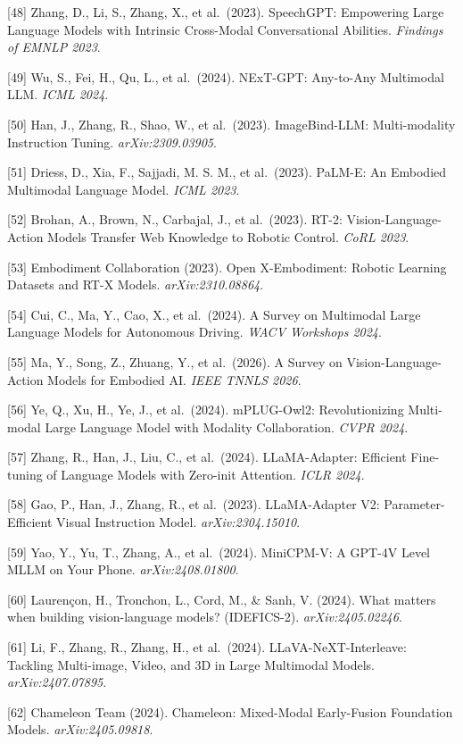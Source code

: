 {[}48{]} Zhang, D., Li, S., Zhang, X., et al.~(2023). SpeechGPT: Empowering Large Language Models with Intrinsic Cross-Modal Conversational Abilities. \emph{Findings of EMNLP 2023}.

{[}49{]} Wu, S., Fei, H., Qu, L., et al.~(2024). NExT-GPT: Any-to-Any Multimodal LLM. \emph{ICML 2024}.

{[}50{]} Han, J., Zhang, R., Shao, W., et al.~(2023). ImageBind-LLM: Multi-modality Instruction Tuning. \emph{arXiv:2309.03905}.

{[}51{]} Driess, D., Xia, F., Sajjadi, M. S. M., et al.~(2023). PaLM-E: An Embodied Multimodal Language Model. \emph{ICML 2023}.

{[}52{]} Brohan, A., Brown, N., Carbajal, J., et al.~(2023). RT-2: Vision-Language-Action Models Transfer Web Knowledge to Robotic Control. \emph{CoRL 2023}.

{[}53{]} Embodiment Collaboration (2023). Open X-Embodiment: Robotic Learning Datasets and RT-X Models. \emph{arXiv:2310.08864}.

{[}54{]} Cui, C., Ma, Y., Cao, X., et al.~(2024). A Survey on Multimodal Large Language Models for Autonomous Driving. \emph{WACV Workshops 2024}.

{[}55{]} Ma, Y., Song, Z., Zhuang, Y., et al.~(2026). A Survey on Vision-Language-Action Models for Embodied AI. \emph{IEEE TNNLS 2026}.

{[}56{]} Ye, Q., Xu, H., Ye, J., et al.~(2024). mPLUG-Owl2: Revolutionizing Multi-modal Large Language Model with Modality Collaboration. \emph{CVPR 2024}.

{[}57{]} Zhang, R., Han, J., Liu, C., et al.~(2024). LLaMA-Adapter: Efficient Fine-tuning of Language Models with Zero-init Attention. \emph{ICLR 2024}.

{[}58{]} Gao, P., Han, J., Zhang, R., et al.~(2023). LLaMA-Adapter V2: Parameter-Efficient Visual Instruction Model. \emph{arXiv:2304.15010}.

{[}59{]} Yao, Y., Yu, T., Zhang, A., et al.~(2024). MiniCPM-V: A GPT-4V Level MLLM on Your Phone. \emph{arXiv:2408.01800}.

{[}60{]} Laurençon, H., Tronchon, L., Cord, M., \& Sanh, V. (2024). What matters when building vision-language models? (IDEFICS-2). \emph{arXiv:2405.02246}.

{[}61{]} Li, F., Zhang, R., Zhang, H., et al.~(2024). LLaVA-NeXT-Interleave: Tackling Multi-image, Video, and 3D in Large Multimodal Models. \emph{arXiv:2407.07895}.

{[}62{]} Chameleon Team (2024). Chameleon: Mixed-Modal Early-Fusion Foundation Models. \emph{arXiv:2405.09818}.


